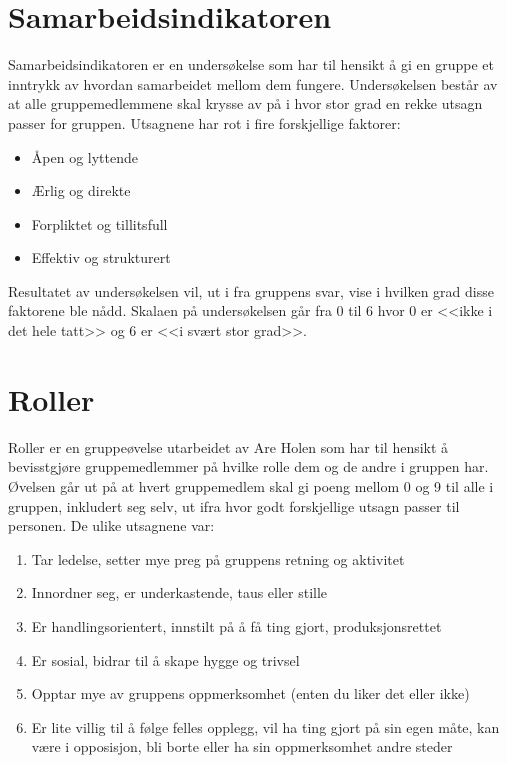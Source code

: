 \section{Samarbeidsindikatoren}
Samarbeidsindikatoren er en undersøkelse som har til hensikt å gi en gruppe et inntrykk av hvordan samarbeidet mellom dem fungere. Undersøkelsen består av at alle gruppemedlemmene skal krysse av på i hvor stor grad en rekke utsagn passer for gruppen. Utsagnene har rot i fire forskjellige faktorer:
\begin{itemize}
\item Åpen og lyttende
\item Ærlig og direkte
\item Forpliktet og tillitsfull
\item Effektiv og strukturert
\end{itemize}
Resultatet av undersøkelsen vil, ut i fra gruppens svar, vise i hvilken grad disse faktorene ble nådd. Skalaen på undersøkelsen går fra 0 til 6 hvor 0 er <<ikke i det hele tatt>> og 6 er <<i svært stor grad>>. 

\section{Roller}
Roller er en gruppeøvelse utarbeidet av Are Holen som har til hensikt å bevisstgjøre gruppemedlemmer på hvilke rolle dem og de andre i gruppen har. Øvelsen går ut på at hvert gruppemedlem skal gi poeng mellom 0 og 9 til alle i gruppen, inkludert seg selv, ut ifra hvor godt forskjellige utsagn passer til personen.
De ulike utsagnene var:
\begin{enumerate}
\item Tar ledelse, setter mye preg på gruppens retning og aktivitet
\item Innordner seg, er underkastende, taus eller stille
\item Er handlingsorientert, innstilt på å få ting gjort, produksjons\-rettet 
\item Er sosial, bidrar til å skape hygge og trivsel
\item Opptar mye av gruppens oppmerksomhet (enten du liker det eller ikke)
\item Er lite villig til å følge felles opplegg, vil ha ting gjort på sin egen måte, kan være i opposisjon, bli borte eller ha sin oppmerksomhet andre steder
\end{enumerate}


